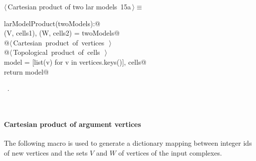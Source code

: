 \documentclass[11pt,oneside]{article}	%
\begin{document}
\begin{flushleft} \small
\begin{minipage}{\linewidth} \label{scrap20}
\protect{}$\langle\,$Cartesian product of two lar models\nobreak\ {\footnotesize 15a}$\,\rangle\equiv$
\vspace{-1ex}
\begin{list}{}{} \item
\mbox{}\verb@def larModelProduct(twoModels):@\\
\mbox{}\verb@    (V, cells1), (W, cells2) = twoModels@\\
\mbox{}\verb@    @\hbox{$\langle\,$Cartesian product of vertices\nobreak\ {\footnotesize {}}$\,\rangle$}\verb@@\\
\mbox{}\verb@    @\hbox{$\langle\,$Topological product of cells\nobreak\ {\footnotesize {}}$\,\rangle$}\verb@@\\
\mbox{}\verb@    model = [list(v) for v in vertices.keys()], cells@\\
\mbox{}\verb@    return model@\\
\mbox{}\verb@@{\NWsep}
\end{list}
\vspace{-1ex}
\footnotesize\addtolength{\baselineskip}{-1ex}
\begin{list}{}{\setlength{\itemsep}{-\parsep}\setlength{\itemindent}{-\leftmargin}}
\item \NWtxtMacroRefIn\ .
\end{list}
\end{minipage}\\[4ex]
\end{flushleft}

\paragraph{Cartesian product of argument vertices}
The following macro is used to generate a dictionary mapping between integer ids of new vertices and the sets $V$ and $W$ of vertices of the input complexes.
\end{document}
